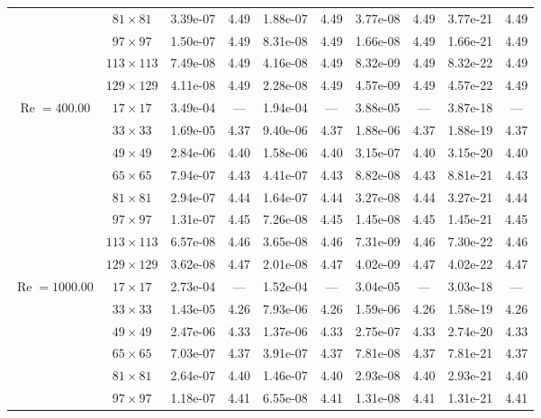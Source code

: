 \documentclass[preprint, 12pt]{elsarticle}
\begin{document}
\begin{center}
\begin{table}[H]
{\begin{tabular*}{\textwidth}{@{\extracolsep\fill}cccccccccc@{}}
    & $81\times 81$ & 3.39e-07 & 4.49 & 1.88e-07 & 4.49 & 3.77e-08 & 4.49 & 3.77e-21 & 4.49 \\
    & $97\times 97$ & 1.50e-07 & 4.49 & 8.31e-08 & 4.49 & 1.66e-08 & 4.49 & 1.66e-21 & 4.49 \\
    & $113\times 113$ & 7.49e-08 & 4.49 & 4.16e-08 & 4.49 & 8.32e-09 & 4.49 & 8.32e-22 & 4.49 \\
    & $129\times 129$ & 4.11e-08 & 4.49 & 2.28e-08 & 4.49 & 4.57e-09 & 4.49 & 4.57e-22 & 4.49 \\
    \hline
    \multirow{7}{*}{$\operatorname{Re}=400.00$} & $17\times 17$ & 3.49e-04 & --- & 1.94e-04 & --- & 3.88e-05 & --- & 3.87e-18 & --- \\
    & $33\times 33$ & 1.69e-05 & 4.37 & 9.40e-06 & 4.37 & 1.88e-06 & 4.37 & 1.88e-19 & 4.37 \\
    & $49\times 49$ & 2.84e-06 & 4.40 & 1.58e-06 & 4.40 & 3.15e-07 & 4.40 & 3.15e-20 & 4.40 \\
    \multirow{3}{*}{$\operatorname{Wi}=5$} & $65\times 65$ & 7.94e-07 & 4.43 & 4.41e-07 & 4.43 & 8.82e-08 & 4.43 & 8.81e-21 & 4.43 \\
    & $81\times 81$ & 2.94e-07 & 4.44 & 1.64e-07 & 4.44 & 3.27e-08 & 4.44 & 3.27e-21 & 4.44 \\
    & $97\times 97$ & 1.31e-07 & 4.45 & 7.26e-08 & 4.45 & 1.45e-08 & 4.45 & 1.45e-21 & 4.45 \\
    & $113\times 113$ & 6.57e-08 & 4.46 & 3.65e-08 & 4.46 & 7.31e-09 & 4.46 & 7.30e-22 & 4.46 \\
    & $129\times 129$ & 3.62e-08 & 4.47 & 2.01e-08 & 4.47 & 4.02e-09 & 4.47 & 4.02e-22 & 4.47 \\
    \hline
    \multirow{7}{*}{$\operatorname{Re}=1000.00$} & $17\times 17$ & 2.73e-04 & --- & 1.52e-04 & --- & 3.04e-05 & --- & 3.03e-18 & --- \\
    & $33\times 33$ & 1.43e-05 & 4.26 & 7.93e-06 & 4.26 & 1.59e-06 & 4.26 & 1.58e-19 & 4.26 \\
    & $49\times 49$ & 2.47e-06 & 4.33 & 1.37e-06 & 4.33 & 2.75e-07 & 4.33 & 2.74e-20 & 4.33 \\
    \multirow{3}{*}{$\operatorname{Wi}=5$} & $65\times 65$ & 7.03e-07 & 4.37 & 3.91e-07 & 4.37 & 7.81e-08 & 4.37 & 7.81e-21 & 4.37 \\
    & $81\times 81$ & 2.64e-07 & 4.40 & 1.46e-07 & 4.40 & 2.93e-08 & 4.40 & 2.93e-21 & 4.40 \\
    & $97\times 97$ & 1.18e-07 & 4.41 & 6.55e-08 & 4.41 & 1.31e-08 & 4.41 & 1.31e-21 & 4.41 \\

\end{tabular*}}
\end{table}
\end{center}
\end{document}
